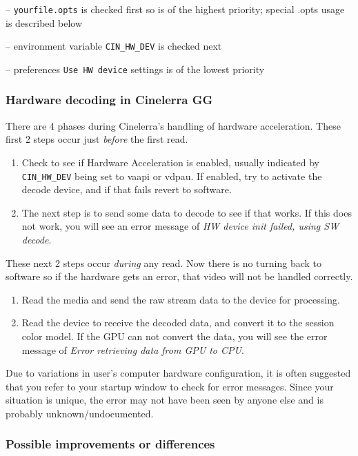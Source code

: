 -- \texttt{yourfile.opts} is checked first so is of the highest priority; special .opts usage is described below

-- environment variable \texttt{CIN\_HW\_DEV} is checked next

-- preferences \texttt{Use HW device} settings is of the lowest priority

\subsubsection*{Hardware decoding in Cinelerra GG}%
\label{ssub:hardware_decoding_cinelerra}

There are 4 phases during Cinelerra’s handling of hardware acceleration. These first 2 steps occur just \textit{before} the first read.

\begin{enumerate}
	\item Check to see if Hardware Acceleration is enabled, usually indicated by \texttt{CIN\_HW\_DEV} being set to
	vaapi or vdpau.  If enabled, try to activate the decode device, and if that fails revert to software.
	\item The next step is to send some data to decode to see if that works. If this does not work, you will see
	an error message of \textit{HW device init failed, using SW decode}.
\end{enumerate}

\noindent These next 2 steps occur \textit{during} any read.  Now there is no turning back to software so if the hardware gets an error, that video will not be handled correctly.

\begin{enumerate} [resume]
	\item Read the media and send the raw stream data to the device for processing.
	\item Read the device to receive the decoded data, and convert it to the session color model.  If the GPU
	can not convert the data, you will see the error message of \textit{Error retrieving data from GPU to CPU}.
\end{enumerate}

Due to variations in user’s computer hardware configuration, it is often suggested that you refer to your startup window to check for error messages.   Since your situation is unique, the error may not have been seen by anyone else and is probably unknown/undocumented.

\subsubsection*{Possible improvements or differences}%
\label{ssub:possible_improvements_differences}

